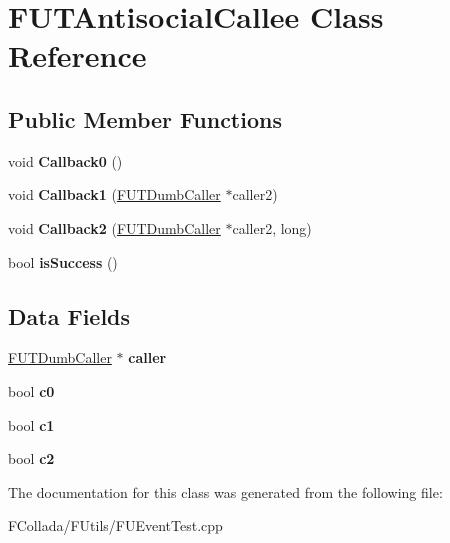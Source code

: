 \hypertarget{classFUTAntisocialCallee}{
\section{FUTAntisocialCallee Class Reference}
\label{classFUTAntisocialCallee}
}
\subsection*{Public Member Functions}
\begin{DoxyCompactItemize}
\item 
\hypertarget{classFUTAntisocialCallee_a0eb2f685246ada963a0974b6161afa8d}{
void {\bfseries Callback0} ()}
\label{classFUTAntisocialCallee_a0eb2f685246ada963a0974b6161afa8d}

\item 
\hypertarget{classFUTAntisocialCallee_a1a3b35cf0168800ed5313d89b784be42}{
void {\bfseries Callback1} (\hyperlink{classFUTDumbCaller}{FUTDumbCaller} $\ast$caller2)}
\label{classFUTAntisocialCallee_a1a3b35cf0168800ed5313d89b784be42}

\item 
\hypertarget{classFUTAntisocialCallee_afd0e0e3c9e10a007ccbba5c92f2dbf9e}{
void {\bfseries Callback2} (\hyperlink{classFUTDumbCaller}{FUTDumbCaller} $\ast$caller2, long)}
\label{classFUTAntisocialCallee_afd0e0e3c9e10a007ccbba5c92f2dbf9e}

\item 
\hypertarget{classFUTAntisocialCallee_af4cfcc08f9b546dbc6d15d8a74a98ea1}{
bool {\bfseries isSuccess} ()}
\label{classFUTAntisocialCallee_af4cfcc08f9b546dbc6d15d8a74a98ea1}

\end{DoxyCompactItemize}
\subsection*{Data Fields}
\begin{DoxyCompactItemize}
\item 
\hypertarget{classFUTAntisocialCallee_ad89c4b8acfe7e80ce4046e59173a0f86}{
\hyperlink{classFUTDumbCaller}{FUTDumbCaller} $\ast$ {\bfseries caller}}
\label{classFUTAntisocialCallee_ad89c4b8acfe7e80ce4046e59173a0f86}

\item 
\hypertarget{classFUTAntisocialCallee_abc12ecab8becd506c9ea935da1fe9783}{
bool {\bfseries c0}}
\label{classFUTAntisocialCallee_abc12ecab8becd506c9ea935da1fe9783}

\item 
\hypertarget{classFUTAntisocialCallee_a14093a5a90705772e4d32a6b88c66ad8}{
bool {\bfseries c1}}
\label{classFUTAntisocialCallee_a14093a5a90705772e4d32a6b88c66ad8}

\item 
\hypertarget{classFUTAntisocialCallee_a1e2b492258b3614d5e68fa1c79c55284}{
bool {\bfseries c2}}
\label{classFUTAntisocialCallee_a1e2b492258b3614d5e68fa1c79c55284}

\end{DoxyCompactItemize}


The documentation for this class was generated from the following file:\begin{DoxyCompactItemize}
\item 
FCollada/FUtils/FUEventTest.cpp\end{DoxyCompactItemize}
